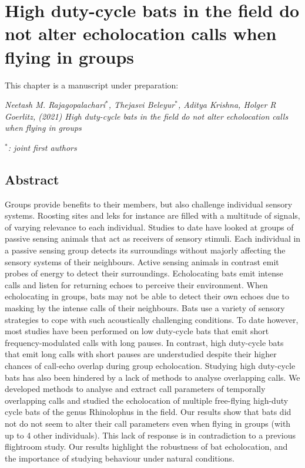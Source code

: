 \documentclass[
]{book}
\begin{document}
\begin{figure}
{}
\label{cpn_figS5}
\end{figure}

\hypertarget{hbcchapter}{%
\chapter{High duty-cycle bats in the field do not alter echolocation calls when flying in groups}\label{hbcchapter}}


This chapter is a manuscript under preparation:

\emph{Neetash M. Rajagopalachari\(^{*}\), Thejasvi Beleyur\(^{*}\), Aditya Krishna, Holger R Goerlitz, (2021) High duty-cycle bats in the field do not alter echolocation calls when flying in groups}

\emph{\(^{*}\): joint first authors}

\newpage

\hypertarget{hbcabstract}{%
\section*{Abstract}\label{hbcabstract}}

Groups provide benefits to their members, but also challenge individual sensory systems. Roosting sites and leks for instance are filled with a multitude of signals, of varying relevance to each individual. Studies to date have looked at groups of passive sensing animals that act as receivers of sensory stimuli. Each individual in a passive sensing group detects its surroundings without majorly affecting the sensory systems of their neighbours. Active sensing animals in contrast emit probes of energy to detect their surroundings. Echolocating bats emit intense calls and listen for returning echoes to perceive their environment. When echolocating in groups, bats may not be able to detect their own echoes due to masking by the intense calls of their neighbours. Bats use a variety of sensory strategies to cope with such acoustically challenging conditions. To date however, most studies have been performed on low duty-cycle bats that emit short frequency-modulated calls with long pauses. In contrast, high duty-cycle bats that emit long calls with short pauses are understudied despite their higher chances of call-echo overlap during group echolocation. Studying high duty-cycle bats has also been hindered by a lack of methods to analyse overlapping calls. We developed methods to analyse and extract call parameters of temporally overlapping calls and studied the echolocation of multiple free-flying high-duty cycle bats of the genus Rhinolophus in the field. Our results show that bats did not do not seem to alter their call parameters even when flying in groups (with up to 4 other individuals). This lack of response is in contradiction to a previous flightroom study. Our results highlight the robustness of bat echolocation, and the importance of studying behaviour under natural conditions.
\end{document}
